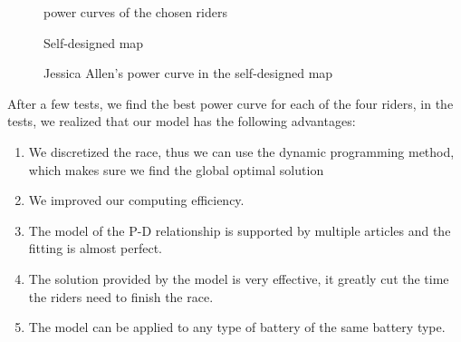\documentclass[12pt]{article}
\begin{document}
\begin{figure}[H]
    \centering

    \caption {power curves of the chosen riders}
\end{figure}

\begin{figure}[H]
    \centering
    \caption{Self-designed map}
\end{figure}
\begin{figure}
    \centering
    
    \caption{Jessica Allen's power curve in the self-designed map}
\end{figure}
After a few tests, we find the best power curve for each of the four riders, in the tests, we realized that
our model has the following advantages:
\begin{enumerate}
    \item We discretized the race, thus we can use the dynamic programming method, which makes sure we find the global optimal solution %
    \item We improved our computing efficiency.%
    \item The model of the P-D relationship is supported by multiple articles and the fitting is almost perfect.
    \item The solution provided by the model is very effective, it greatly cut the time the riders need to finish the race.
    \item The model can be applied to any type of battery of the same battery type.
\end{enumerate}
\end{document}
